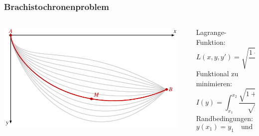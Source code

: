 %
%
%
\bgroup
\begin{frame}
\setlength{\abovedisplayskip}{5pt}
\setlength{\belowdisplayskip}{5pt}
\frametitle{Brachistochronenproblem}
\begin{columns}[t,onlytextwidth]
\begin{column}{0.64\textwidth}
\vspace*{-20pt}
\begin{center}
\includegraphics[width=0.96\textwidth]{../slides/2/bernoulli.pdf}
\end{center}
\end{column}
\begin{column}{0.36\textwidth}
Lagrange-Funktion:
\[
L(x,y,y')
=
\sqrt{
\frac{1+y^{\prime 2}}{y}
}
\]
Funktional zu minimieren:
\[
I(y) 
=
\int_{x_1}^{x_2}
\frac{\!\sqrt{1+y'(x)^2}}{\!\sqrt{y(x)}} \,dx
\]
Randbedingungen:
\[
y(x_1)=y_1
\quad\text{und}\quad
y(x_2)=y_2
\]
\end{column}
\end{columns}
\end{frame}
\egroup
